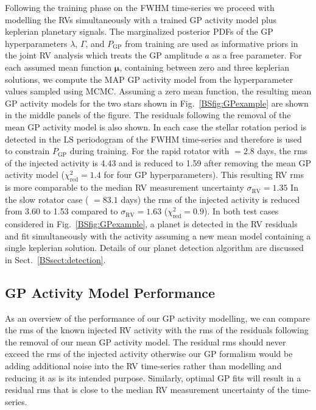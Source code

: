 Following the training phase on the FWHM time-series
we proceed with modelling the RVs simultaneously with a trained GP activity model plus keplerian planetary
signals. The marginalized posterior PDFs of the GP hyperparameters $\lambda$, $\Gamma$, and $P_{\text{GP}}$
from training are used as informative priors in the joint RV analysis which treats the GP amplitude
$a$ as a free parameter. For each assumed mean function $\boldsymbol{\mu}$, containing between zero and three
keplerian solutions, we compute the MAP GP activity model from the hyperparameter values sampled using MCMC.
Assuming a zero mean function, the resulting mean GP activity models
for the two stars shown in Fig.~\ref{BSfig:GPexample} are shown in the middle panels of the figure. The residuals
following the removal of the mean GP activity model is also shown. In each case the stellar rotation period is
detected in the LS periodogram of the FWHM time-series and therefore is used to constrain $P_{\text{GP}}$ during
training. For the rapid rotator with \prot{} $=2.8$ days, the rms of the injected activity is 4.43 \mps{} and
is reduced to 1.59 \mps{} after removing the mean GP activity model ($\chi_{\text{red}}^2 =1.4$ for four GP hyperparameters).
This resulting RV rms is more comparable
to the median RV measurement uncertainty $\sigma_{\text{RV}}=1.35$  In the slow rotator case (\prot{} $=83.1$ days)
the rms of the injected activity is reduced from 3.60 \mps{} to 1.53 \mps{} compared to
$\sigma_{\text{RV}}=1.63$ \mps{} ($\chi_{\text{red}}^2 =0.9$). In both test cases considered in
Fig.~\ref{BSfig:GPexample}, a planet is detected in the RV residuals and fit simultaneously with the activity assuming
a new mean model containing a single keplerian solution. Details of our planet detection algorithm are discussed in
Sect.~\ref{BSsect:detection}.


\subsection{GP Activity Model Performance}
As an overview of the performance of our GP activity modelling, we can compare the rms of the known
injected RV activity with the rms of the residuals following the removal of our mean GP activity model. The residual
rms should never exceed the rms of the injected activity otherwise our GP formalism would be adding additional noise
into the RV time-series rather than modelling and reducing it as is its intended purpose. Similarly, optimal GP fits
will result in a residual rms that is close to the median RV measurement uncertainty of the time-series. \\

